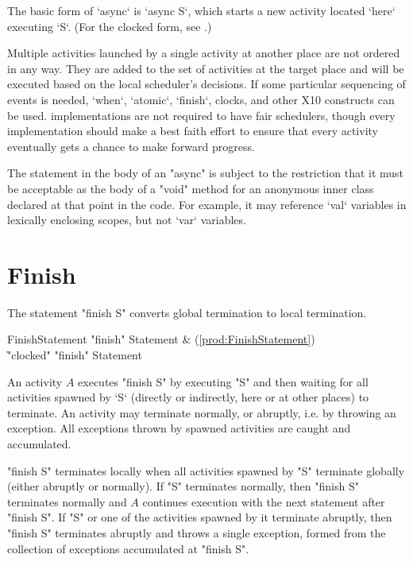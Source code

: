 The basic form of \xcd`async` is \xcd`async S`, which starts a new activity
located \xcd`here` executing \xcd`S`.   (For the clocked form, see
.)  

Multiple activities launched by a single activity at another place are not
ordered in any way. They are added to the set of activities at the target
place and will be executed based on the local scheduler's decisions.
If some particular sequencing of events is needed, \xcd`when`, \xcd`atomic`,
\xcd`finish`, clocks, and other X10 constructs can be used.
\Xten{} implementations are not required to have fair schedulers,
though every implementation should make a best faith effort to ensure
that every activity eventually gets a chance to make forward progress.


The statement in the body of an \xcd"async" is subject to the
restriction that it must be acceptable as the body of a \xcd"void"
method for an anonymous inner class declared at that point in the code. For
example, it may reference \xcd`val` variables in lexically enclosing scopes,
but 
not \xcd`var` variables.


\section{Finish}\label{finish}
The statement \xcd"finish S" converts global termination to local
termination.

\begin{bbgrammar}
     FinishStatement \: \xcd"finish" Statement & (\ref{prod:FinishStatement}) \\
                    \| \xcd"clocked" \xcd"finish" Statement \\
\end{bbgrammar}

An activity $A$ executes \xcd"finish S" by executing \xcd"S" and
then waiting for all activities spawned by \xcd`S` (directly or
indirectly, here or at other places) to terminate. An activity may
terminate normally, or abruptly, i.e. by throwing an exception.
All exceptions thrown by spawned activities are caught and
accumulated. 

\xcd"finish S" terminates locally when all activities spawned by
\xcd"S" terminate globally (either abruptly or normally). If \xcd"S"
terminates normally, then \xcd"finish S" terminates normally and $A$
continues execution with the next statement after \xcd"finish S".  If
\xcd"S" or one of the activities spawned by it terminate abruptly,
then \xcd"finish S" terminates abruptly and throws a single exception,
 formed from the collection of
exceptions accumulated at \xcd"finish S".

